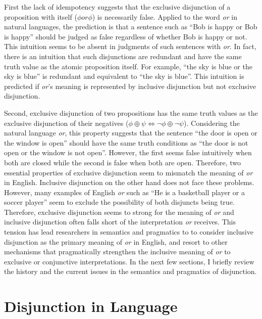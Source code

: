 \documentclass[oneside]{report}
\theoremstyle{definition}
\theoremstyle{definition}
\theoremstyle{definition}
\theoremstyle{remark}
\begin{document}
First the lack of idempotency suggests that the exclusive disjunction of
a proposition with itself (\(\phi or \phi\)) is necessarily false.
Applied to the word \emph{or} in natural languages, the prediction is
that a sentence such as ``Bob is happy or Bob is happy'' should be
judged as false regardless of whether Bob is happy or not. This
intuition seems to be absent in judgments of such sentences with
\emph{or}. In fact, there is an intuition that such disjunctions are
redundant and have the same truth value as the atomic proposition
itself. For example, ``the sky is blue or the sky is blue'' is redundant
and equivalent to ``the sky is blue''. This intuition is predicted if
\emph{or}'s meaning is represented by inclusive disjunction but not
exclusive disjunction.

Second, exclusive disjunction of two propositions has the same truth
values as the exclusive disjunction of their negatives
(\(\phi \oplus \psi \Leftrightarrow \lnot\phi \oplus \lnot\psi\)).
Considering the natural language \emph{or}, this property suggests that
the sentence ``the door is open or the window is open'' should have the
same truth conditions as ``the door is not open or the window is not
open''. However, the first seems false intuitively when both are closed
while the second is false when both are open. Therefore, two essential
properties of exclusive disjunction seem to mismatch the meaning of
\emph{or} in English. Inclusive disjunction on the other hand does not
face these problems. However, many examples of English \emph{or} such as
``He is a basketball player or a soccer player'' seem to exclude the
possibility of both disjuncts being true. Therefore, exclusive
disjunction seems to strong for the meaning of \emph{or} and inclusive
disjunction often falls short of the interpretation \emph{or} receives.
This tension has lead researchers in semantics and pragmatics to to
consider inclusive disjunction as the primary meaning of \emph{or} in
English, and resort to other mechanisms that pragmatically strengthen
the inclusive meaning of \emph{or} to exclusive or conjunctive
interpretations. In the next few sections, I briefly review the history
and the current issues in the semantics and pragmatics of disjunction.

\section{Disjunction in Language}\label{disjunction-in-language}
\end{document}
